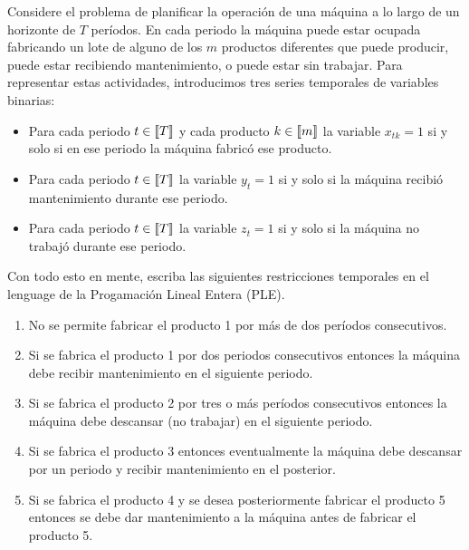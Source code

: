 \documentclass[ a4paper, twoside, 11pt]{article}
\begin{document}
\begin{problem}
Considere el problema de planificar la operaci\'on de una m\'aquina a lo largo de un horizonte de $T$ per\'iodos. En cada periodo la m\'aquina puede estar ocupada fabricando un lote de alguno de los $m$ productos diferentes que puede producir, puede estar recibiendo mantenimiento, o puede estar sin trabajar. Para representar estas actividades, introducimos tres series temporales de variables binarias: 
\begin{itemize}
\item Para cada periodo $t \in \llbracket T \rrbracket$ y cada producto $k \in \llbracket m \rrbracket$ la variable $x_{tk} = 1$ si y solo si en ese periodo la m\'aquina fabric\'o ese producto. 
\item Para cada periodo $t \in \llbracket T \rrbracket$ la variable $y_t = 1$ si y solo si la m\'aquina recibi\'o mantenimiento durante ese periodo. 
\item Para cada periodo $t \in \llbracket T \rrbracket$ la variable $z_t = 1$ si y solo si la m\'aquina no trabaj\'o durante ese periodo. 
\end{itemize}

Con todo esto en mente, escriba las siguientes restricciones temporales en el lenguage de la Progamaci\'on Lineal Entera (PLE). 
\begin{enumerate}[label=\textbf{\alph*)}]
\item No se permite fabricar el producto 1 por m\'as de dos per\'iodos consecutivos. 
\item Si se fabrica el producto 1 por dos periodos consecutivos entonces la m\'aquina debe recibir mantenimiento en el siguiente periodo. 
\item Si se fabrica el producto 2 por tres o m\'as per\'iodos consecutivos entonces la m\'aquina debe descansar (\ie no trabajar) en el siguiente periodo. 
\item Si se fabrica el producto 3 entonces eventualmente la m\'aquina debe descansar por un periodo y recibir mantenimiento en el posterior. 
\item Si se fabrica el producto 4 y se desea posteriormente fabricar el producto 5 entonces se debe dar mantenimiento a la m\'aquina antes de fabricar el producto 5. 
\end{enumerate}
\QED

\end{problem}
\vspace{\baselineskip}
\end{document}

